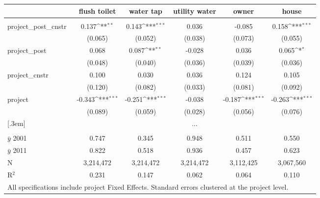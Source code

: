 {\footnotesize
{}  
\def\sym#1{\ifmmode^{#1}\else\(^{#1}\)\fi}
\begin{tabular}{l*{5}{c}}
          &\multicolumn{1}{c}{flush toilet}         &\multicolumn{1}{c}{water tap}         &\multicolumn{1}{c}{utility water}         &\multicolumn{1}{c}{owner}         &\multicolumn{1}{c}{house}         \\[0.2em]
\hline\\[-0.9em]
\rowcolor{o} {\scriptsize project\_post\_cnstr$\,\,\,$}  &  0.137\sym{**} &  0.143\sym{***}&   0.036       &   -0.085         &    0.158\sym{***}\\
\rowcolor{o} &  (0.065)       &  (0.052)       &  (0.038)      &  (0.073)         &  (0.055)         \\
[.5em]
{\scriptsize project\_post}&    0.068     &   0.087\sym{**} &   -0.028      &    0.036         &    0.065\sym{*}  \\
            &  (0.048)     &  (0.040)        &  (0.036)      &  (0.039)         &  (0.036)         \\
[.5em]
{\scriptsize project\_cnstr}& 0.100   &    0.030        &    0.036      &    0.124         &    0.105         \\
                 &(0.120)  &  (0.082)        &  (0.033)      &  (0.081)         &  (0.092)         \\
[.5em]
{\scriptsize project}    &-0.343\sym{***}& -0.251\sym{***} &  -0.038       & -0.187\sym{***}  &   -0.263\sym{***}\\
           &  (0.089)      &  (0.059)        &  (0.028)      &  (0.056)         &  (0.076)         \\
[.3em]
& \multicolumn{5}{c}{...}\\
[.5em]
\hline \\[-0.9em] 
$\bar{y}$ 2001& 0.747      &    0.345        &    0.948      &    0.511         &    0.550         \\
$\bar{y}$ 2011& 0.822      &    0.518        &    0.936      &    0.457         &    0.623         \\
N          &  3,214,472    &  3,214,472      &  3,214,472    &  3,112,425       &  3,067,560       \\
R$^{2}$    &    0.231      &    0.147        &    0.062      &    0.064         &    0.110         \\
\hline
\multicolumn{6}{l}{\tiny All specifications include project Fixed Effects. Standard errors clustered at the project level.}
\end{tabular}
}
